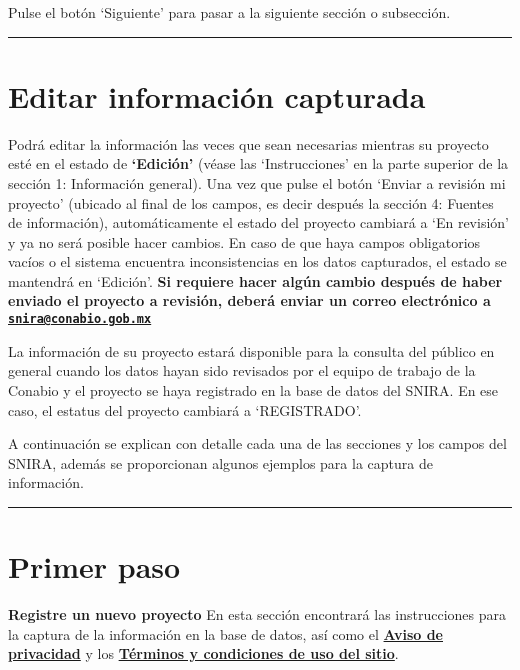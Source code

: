 \documentclass[
]{book}
\begin{document}
Pulse el botón `Siguiente' para pasar a la siguiente sección o subsección.

\begin{center}\rule{0.5\linewidth}{0.5pt}\end{center}

\hypertarget{editar-informaciuxf3n-capturada}{%
\section*{Editar información capturada}\label{editar-informaciuxf3n-capturada}}

Podrá editar la información las veces que sean necesarias mientras su proyecto esté en el estado de \textbf{`Edición'} (véase las `Instrucciones' en la parte superior de la sección 1: Información general). Una vez que pulse el botón `Enviar a revisión mi proyecto' (ubicado al final de los campos, es decir después la sección 4: Fuentes de información), automáticamente el estado del proyecto cambiará a `En revisión' y ya no será posible hacer cambios. En caso de que haya campos obligatorios vacíos o el sistema encuentra inconsistencias en los datos capturados, el estado se mantendrá en `Edición'. \textbf{Si requiere hacer algún cambio después de haber enviado el proyecto a revisión, deberá enviar un correo electrónico a \href{mailto:snira@conabio.gob.mx}{\nolinkurl{snira@conabio.gob.mx}}}

La información de su proyecto estará disponible para la consulta del público en general cuando los datos hayan sido revisados por el equipo de trabajo de la Conabio y el proyecto se haya registrado en la base de datos del SNIRA. En ese caso, el estatus del proyecto cambiará a `REGISTRADO'.

A continuación se explican con detalle cada una de las secciones y los campos del SNIRA, además se proporcionan algunos ejemplos para la captura de información.

\begin{center}\rule{0.5\linewidth}{0.5pt}\end{center}

\hypertarget{primer-paso}{%
\section*{Primer paso}\label{primer-paso}}

\textbf{Registre un nuevo proyecto}
En esta sección encontrará las instrucciones para la captura de la información en la base de datos, así como el \href{https://www.biodiversidad.gob.mx/conabio/proteccion-DP/ap-solicitudes-de-acceso-infopub}{\textbf{Aviso de privacidad}} y los \href{https://www.gob.mx/terminos}{\textbf{Términos y condiciones de uso del sitio}}.
\end{document}
